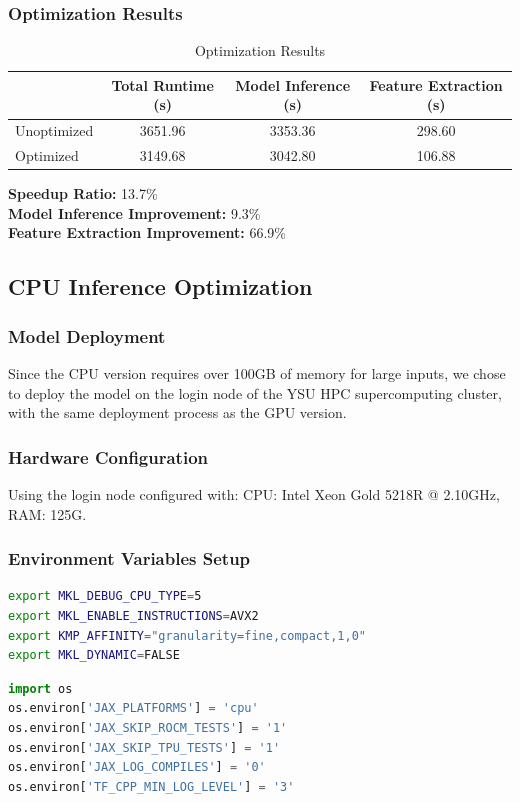 \documentclass[a4paper,12pt]{article}
\begin{document}
\subsubsection{Optimization Results}

\begin{table}[H]
\centering
\caption{Optimization Results}
\vspace{0.5cm}
\begin{tabular}{lccc}
\toprule
 & Total Runtime (s) & Model Inference (s) & Feature Extraction (s) \\
\midrule
Unoptimized & 3651.96 & 3353.36 & 298.60 \\
Optimized & 3149.68 & 3042.80 & 106.88 \\
\bottomrule
\end{tabular}
\end{table}
\textbf{Speedup Ratio:} 13.7\% \\
\textbf{Model Inference Improvement:} 9.3\% \\
\textbf{Feature Extraction Improvement:} 66.9\%

\subsection{CPU Inference Optimization}

\subsubsection{Model Deployment}
Since the CPU version requires over 100GB of memory for large inputs, we chose to deploy the model on the login node of the YSU HPC supercomputing cluster, with the same deployment process as the GPU version.

\subsubsection{Hardware Configuration}
Using the login node configured with: CPU: Intel Xeon Gold 5218R @ 2.10GHz, RAM: 125G.

\subsubsection{Environment Variables Setup}
\begin{lstlisting}[language=bash]
export MKL_DEBUG_CPU_TYPE=5
export MKL_ENABLE_INSTRUCTIONS=AVX2
export KMP_AFFINITY="granularity=fine,compact,1,0"
export MKL_DYNAMIC=FALSE
\end{lstlisting}
\begin{lstlisting}[language=python]
import os
os.environ['JAX_PLATFORMS'] = 'cpu'
os.environ['JAX_SKIP_ROCM_TESTS'] = '1'
os.environ['JAX_SKIP_TPU_TESTS'] = '1'
os.environ['JAX_LOG_COMPILES'] = '0'
os.environ['TF_CPP_MIN_LOG_LEVEL'] = '3'
\end{lstlisting}
\end{document}
